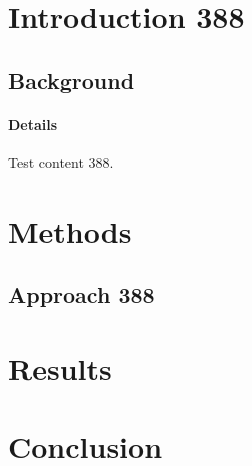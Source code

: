 \documentclass{article}
\begin{document}
\section{Introduction 388}
\subsection{Background}
\paragraph{Details} Test content 388.
\section{Methods}
\subsection{Approach 388}
\section{Results}
\section{Conclusion}
\end{document}
